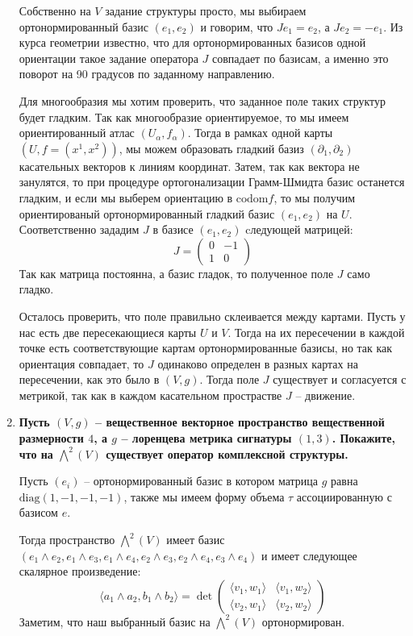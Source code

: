 \documentclass{article}
\begin{document}
\begin{enumerate}
        Собственно на $V$ задание структуры просто, мы выбираем ортонормированный
        базис $(e_1, e_2)$ и говорим, что $Je_1=e_2$, а $Je_2=-e_1$. Из курса 
        геометрии известно, что для ортонормированных базисов одной ориентации
        такое задание оператора $J$ совпадает по базисам, а именно это поворот
        на 90 градусов по заданному направлению.

        Для многообразия мы хотим проверить, что заданное поле таких структур
        будет гладким. Так как многообразие ориентируемое, то мы имеем
        ориентированный атлас $(U_\alpha, f_\alpha)$. Тогда в рамках одной карты
        $(U,f=(x^1, x^2))$, мы можем образовать гладкий базиз
        $(\partial_1, \partial_2)$ касательных векторов к линиям координат.
        Затем, так как вектора не занулятся, то при процедуре ортогонализации
        Грамм-Шмидта базис останется гладким, и если мы выберем ориентацию в
        $\text{codom}f$, то мы получим ориентированый ортонормированный гладкий
        базис $(e_1,e_2)$ на $U$. Соответственно зададим $J$ в базисе $(e_1,e_2)$
        cледующей матрицей:
        \[J=\left(\begin{array}{cc}0&-1\\1&0\end{array}\right)\]
        Так как матрица постоянна, а базис гладок, то полученное поле $J$ само
        гладко.

        Осталось проверить, что поле правильно склеивается между картами. Пусть
        у нас есть две пересекающиеся карты $U$ и $V$. Тогда на их пересечении
        в каждой точке есть соответствующие картам ортонормированные базисы,
        но так как ориентация совпадает, то $J$ одинаково определен в разных
        картах на пересечении, как это было в $(V,g)$. Тогда поле $J$ существует
        и согласуется с метрикой, так как в каждом касательном прострастве $J$ 
        – движение.

    \item \textbf{Пусть $(V,g)$ – вещественное векторное пространство вещественной
        размерности $4$, а $g$ – лоренцева метрика сигнатуры $(1,3)$. Покажите,
        что на $\bigwedge^2(V)$ существует оператор комплексной структуры.}

        Пусть $(e_i)$ – ортонормированный базис в котором матрица $g$ равна
        $\text{diag}(1,-1,-1,-1)$, также мы имеем форму объема $\tau$ ассоциированную
        с базисом $e$.

        Тогда пространство $\bigwedge^2(V)$ имеет базис $(e_1\wedge e_2,
        e_1\wedge e_3,e_1\wedge e_4,e_2\wedge e_3,e_2\wedge e_4,e_3\wedge e_4)$
        и имеет следующее скалярное произведение:
        \[\langle a_1\wedge a_2, b_1\wedge b_2\rangle = \det\left(\begin{array}{cc}\langle v_1,w_1\rangle&
        \langle v_1,w_2\rangle\\ \langle v_2,w_1\rangle& \langle v_2,w_2\rangle\end{array}\right)\]
        Заметим, что наш выбранный базис на $\bigwedge^2(V)$ ортонормирован.


\end{enumerate}
\end{document}

